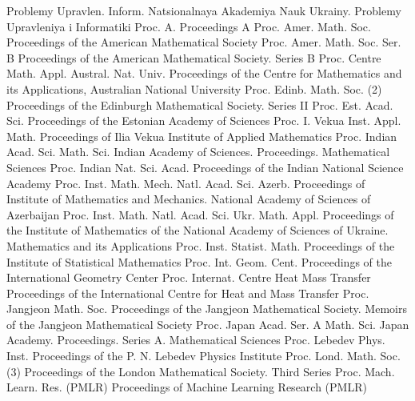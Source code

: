 {Problemy Upravlen. Inform.}
{Natsionalnaya Akademiya Nauk Ukrainy. Problemy Upravleniya i Informatiki}
{Proc. A.}
{Proceedings A}
{Proc. Amer. Math. Soc.}
{Proceedings of the American Mathematical Society}
{Proc. Amer. Math. Soc. Ser. B}
{Proceedings of the American Mathematical Society. Series B}
{Proc. Centre Math. Appl. Austral. Nat. Univ.}
{Proceedings of the Centre for Mathematics and its Applications, Australian National University}
{Proc. Edinb. Math. Soc. (2)}
{Proceedings of the Edinburgh Mathematical Society. Series II}
{Proc. Est. Acad. Sci.}
{Proceedings of the Estonian Academy of Sciences}
{Proc. I. Vekua Inst. Appl. Math.}
{Proceedings of Ilia Vekua Institute of Applied Mathematics}
{Proc. Indian Acad. Sci. Math. Sci.}
{Indian Academy of Sciences. Proceedings. Mathematical Sciences}
{Proc. Indian Nat. Sci. Acad.}
{Proceedings of the Indian National Science Academy}
{Proc. Inst. Math. Mech. Natl. Acad. Sci. Azerb.}
{Proceedings of Institute of Mathematics and Mechanics. National Academy of Sciences of Azerbaijan}
{Proc. Inst. Math. Natl. Acad. Sci. Ukr. Math. Appl.}
{Proceedings of the Institute of Mathematics of the National Academy of Sciences of Ukraine. Mathematics and its Applications}
{Proc. Inst. Statist. Math.}
{Proceedings of the Institute of Statistical Mathematics}
{Proc. Int. Geom. Cent.}
{Proceedings of the International Geometry Center}
{Proc. Internat. Centre Heat Mass Transfer}
{Proceedings of the International Centre for Heat and Mass Transfer}
{Proc. Jangjeon Math. Soc.}
{Proceedings of the Jangjeon Mathematical Society. Memoirs of the Jangjeon Mathematical Society}
{Proc. Japan Acad. Ser. A Math. Sci.}
{Japan Academy. Proceedings. Series A. Mathematical Sciences}
{Proc. Lebedev Phys. Inst.}
{Proceedings of the P. N. Lebedev Physics Institute}
{Proc. Lond. Math. Soc. (3)}
{Proceedings of the London Mathematical Society. Third Series}
{Proc. Mach. Learn. Res. (PMLR)}
{Proceedings of Machine Learning Research (PMLR)}
